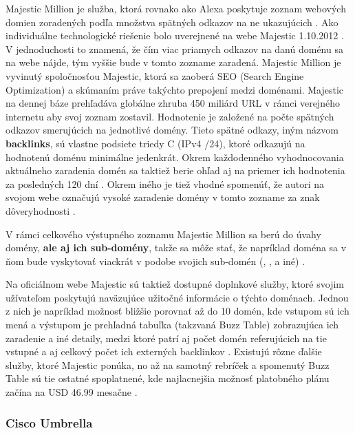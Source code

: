 {Majestic Million je služba, ktorá rovnako ako Alexa poskytuje zoznam webových domien zoradených podľa množstva spätných odkazov na ne ukazujúcich \cite{majestic-million-homepage}\cite{majestic-million-ranking}.
Ako individuálne technologické riešenie bolo uverejnené na webe Majestic 1.10.2012 \cite{majestic-million-publication}.
V jednoduchosti to znamená, že čím viac priamych odkazov na danú doménu sa na webe nájde, tým vyššie bude v tomto zozname zaradená. 
Majestic Million je vyvinutý spoločnosťou Majestic, ktorá sa zaoberá SEO (Search Engine Optimization) a skúmaním práve takýchto prepojení medzi doménami.
Majestic na dennej báze prehľadáva globálne zhruba 450 miliárd URL v rámci verejného internetu aby svoj zoznam zostavil. 
Hodnotenie je založené na počte spätných odkazov smerujúcich na jednotlivé domény. Tieto spätné odkazy, iným názvom \textbf{backlinks}, sú vlastne podsiete triedy C (IPv4 /24), ktoré odkazujú
na hodnotenú doménu minimálne jedenkrát.
Okrem každodenného vyhodnocovania aktuálneho zaradenia domén sa taktiež berie ohľad aj na priemer ich hodnotenia za posledných 120 dní \cite{tranco-methodology}.
Okrem iného je tiež vhodné spomenúť, že autori na svojom webe označujú vysoké zaradenie domény v tomto zozname za znak dôveryhodnosti \cite{majestic-million-homepage}.

V rámci celkového výstupného zoznamu Majestic Million sa berú do úvahy domény, \textbf{ale aj ich sub-domény}, takže sa môže stať, že napríklad doména  sa v ňom bude vyskytovať viackrát v podobe 
svojich sub-domén (, ,  a iné) \cite{majestic-million-sub-domain-filtered}.

Na oficiálnom webe Majestic sú taktiež dostupné doplnkové služby, ktoré svojim užívateľom poskytujú naväzujúce užitočné informácie o týchto doménach. 
Jednou z nich je napríklad možnosť bližšie porovnať až do 10 domén, kde vstupom sú ich mená a výstupom je prehľadná tabuľka (takzvaná Buzz Table) zobrazujúca ich zaradenie a iné detaily, medzi ktoré patrí aj počet domén
referujúcich na tie vstupné a aj celkový počet ich externých backlinkov \cite{majestic-million-homepage}.
Existujú rôzne ďalšie služby, ktoré Majestic ponúka, no až na samotný rebríček a spomenutý Buzz Table sú tie ostatné spoplatnené, kde najlacnejšia možnosť platobného plánu začína na USD 46.99 mesačne \cite{majestic-million-pricing}.

\subsubsection{Cisco Umbrella}

}
